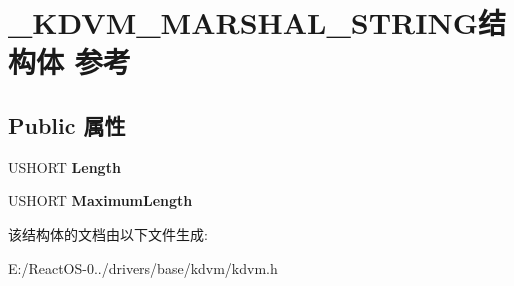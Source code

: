 \hypertarget{struct___k_d_v_m___m_a_r_s_h_a_l___s_t_r_i_n_g}{}\section{\+\_\+\+K\+D\+V\+M\+\_\+\+M\+A\+R\+S\+H\+A\+L\+\_\+\+S\+T\+R\+I\+N\+G结构体 参考}
\label{struct___k_d_v_m___m_a_r_s_h_a_l___s_t_r_i_n_g}
\subsection*{Public 属性}
\begin{DoxyCompactItemize}
\item 
\mbox{\label{struct___k_d_v_m___m_a_r_s_h_a_l___s_t_r_i_n_g_a37157eee672aa661935c30dcf7983b89}} 
U\+S\+H\+O\+RT {\bfseries Length}
\item 
\mbox{\label{struct___k_d_v_m___m_a_r_s_h_a_l___s_t_r_i_n_g_a0fd1b754d50f0dd1d95efd2847997d25}} 
U\+S\+H\+O\+RT {\bfseries Maximum\+Length}
\end{DoxyCompactItemize}


该结构体的文档由以下文件生成\+:\begin{DoxyCompactItemize}
\item 
E\+:/\+React\+O\+S-\/0../drivers/base/kdvm/kdvm.\+h\end{DoxyCompactItemize}
